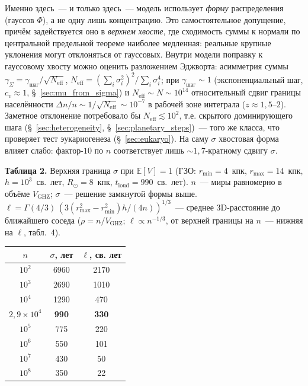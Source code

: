 \documentclass[12pt,a4paper]{article}
\begin{document}
Именно здесь~--- и только здесь~--- модель использует \emph{форму} распределения (гауссов $\Phi$), а не одну лишь концентрацию. Это самостоятельное допущение, причём задействуется оно в \emph{верхнем хвосте}, где сходимость суммы к нормали по центральной предельной теореме наиболее медленная: реальные крупные уклонения могут отклоняться от гауссовых. Внутри модели поправку к гауссовому хвосту можно оценить разложением Эджворта: асимметрия суммы $\gamma_\Sigma=\gamma_{\text{шаг}}/\sqrt{N_{\mathrm{eff}}}$, $N_{\mathrm{eff}}=(\sum_i\sigma_i^2)^2/\sum_i\sigma_i^4$; при $\gamma_{\text{шаг}}\sim1$ (экспоненциальный шаг, $c_v\approx1$, \S~\ref{sec:mu_from_sigma}) и $N_{\mathrm{eff}}\sim N\sim10^{14}$ относительный сдвиг границы населённости $\Delta n/n\sim1/\sqrt{N_{\mathrm{eff}}}\sim10^{-7}$ в рабочей зоне интеграла ($z\approx1{,}5$--$2$). Заметное отклонение потребовало бы $N_{\mathrm{eff}}\lesssim10^2$, т.е. скрытого доминирующего шага (\S~\ref{sec:heterogeneity}, \S~\ref{sec:planetary_steps})~--- того же класса, что проверяет тест эукариогенеза (\S~\ref{sec:eukaryo}). На саму $\sigma$ хвостовая форма влияет слабо: фактор-$10$ по $n$ соответствует лишь $\sim1{,}7$-кратному сдвигу $\sigma$.

\begin{center}
\textbf{Таблица 2.} Верхняя граница $\sigma$ при $\mathbb{E}[V]=1$ (ГЗО: $r_{\min}=4$~кпк, $r_{\max}=14$~кпк, $h = 10^3$~св.~лет, $R_\odot=8$~кпк, $t_{\mathrm{loud}} = 990$~св.~лет). $n$~--- миры равномерно в объёме $V_{\mathrm{GHZ}}$; $\sigma$~--- решение замкнутой формы выше. $\ell = \Gamma(4/3)\,(3(r_{\max}^2-r_{\min}^2)h/(4n))^{1/3}$~--- среднее 3D-расстояние до ближайшего соседа ($\rho = n/V_{\mathrm{GHZ}}$; $\ell \propto n^{-1/3}$, от верхней границы на $n$~--- нижняя на $\ell$, табл.~4).

\medskip
\small
\begin{tabular}{c c c}
\hline
$n$ & $\sigma$, лет & $\ell$, св. лет \\
\hline
$10^2$ & 6960 & 2170 \\
$10^3$ & 2690 & 1010 \\
$10^4$ & 1290 & 470 \\
\textbf{$2{,}9 \times 10^4$} & \textbf{990} & \textbf{330} \\
$10^5$ & 775 & 220 \\
$10^6$ & 550 & 101 \\
$10^7$ & 430 & 50 \\
$10^8$ & 350 & 22 \\
\hline
\end{tabular}
\normalsize
\end{center}
\end{document}
